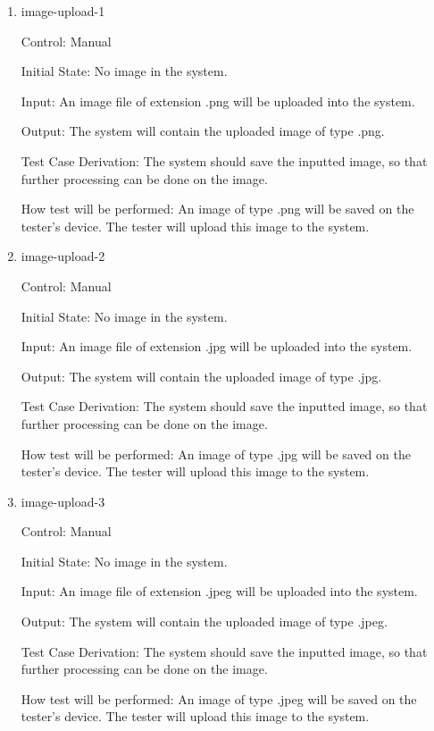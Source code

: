 \documentclass[12pt, titlepage]{article}
\begin{document}
	\begin{enumerate}
		
		\item{image-upload-1\\}
		
		Control: Manual
		
		Initial State: No image in the system.
		
		Input: An image file of extension .png will be uploaded into the system.
		
		Output: The system will contain the uploaded image of type .png.
		
		Test Case Derivation: The system should save the inputted image, so that further processing can be done on the image.
		
		How test will be performed: An image of type .png will be saved on the tester's device. The tester will upload this image to the system.
		
		\item{image-upload-2\\}
		
		Control: Manual
		
		Initial State: No image in the system.
		
		Input: An image file of extension .jpg will be uploaded into the system.
		
		Output: The system will contain the uploaded image of type .jpg.
		
		Test Case Derivation: The system should save the inputted image, so that further processing can be done on the image.
		
		How test will be performed: An image of type .jpg will be saved on the tester's device. The tester will upload this image to the system.
		
		\item{image-upload-3\\}
		
		Control: Manual
		
		Initial State: No image in the system.
		
		Input: An image file of extension .jpeg will be uploaded into the system.
		
		Output: The system will contain the uploaded image of type .jpeg.
		
		Test Case Derivation: The system should save the inputted image, so that further processing can be done on the image.
		
		How test will be performed: An image of type .jpeg will be saved on the tester's device. The tester will upload this image to the system.
		

\end{enumerate}
\end{document}
